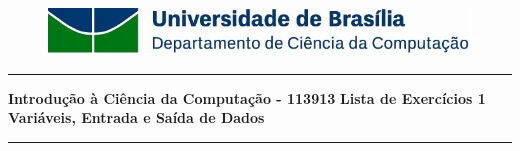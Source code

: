 \documentclass[a4paper, 12pt]{article}
\begin{document}
\begin{figure}[H]
	\includegraphics[scale=0.9]{UnB_CiC_Logo.jpg}
\end{figure}
\noindent\rule{\textwidth}{0.4pt}
\begin{center}
	\textbf{{\Large Introdução à Ciência da Computação - 113913}} \newline \newline
	\textbf{{\large Lista de Exercícios 1} \\
	\vspace{9pt}
	{\large Variáveis, Entrada e Saída de Dados}} \\
	\noindent\rule{\textwidth}{0.4pt}
	\newline
\end{center}
\end{document}

